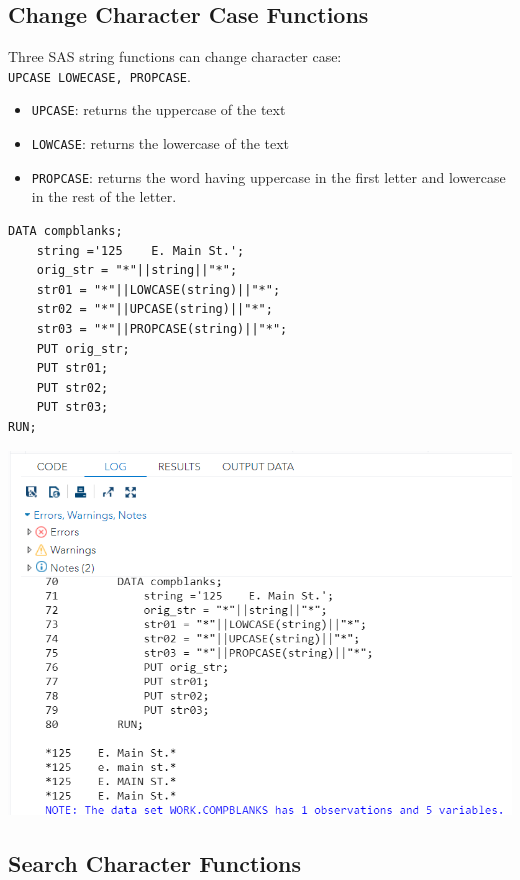 \documentclass[
]{book}
\providecommand{\tightlist}{%
  \setlength{\itemsep}{0pt}\setlength{\parskip}{0pt}}
\begin{document}
\hypertarget{change-character-case-functions}{%
\subsection{Change Character Case Functions}\label{change-character-case-functions}}

Three SAS string functions can change character case: \texttt{UPCASE\ LOWECASE,\ PROPCASE}.

\begin{itemize}
\tightlist
\item
  \texttt{UPCASE}: returns the uppercase of the text
\item
  \texttt{LOWCASE}: returns the lowercase of the text
\item
  \texttt{PROPCASE}: returns the word having uppercase in the first letter and lowercase in the rest of the letter.
\end{itemize}

\begin{verbatim}
DATA compblanks;
    string ='125    E. Main St.';
    orig_str = "*"||string||"*";
    str01 = "*"||LOWCASE(string)||"*";
    str02 = "*"||UPCASE(string)||"*";
    str03 = "*"||PROPCASE(string)||"*";
    PUT orig_str;
    PUT str01;
    PUT str02;
    PUT str03;
RUN;
\end{verbatim}

\begin{center}\includegraphics[width=1\linewidth]{img10/w10-lowUpCases} \end{center}

\hypertarget{search-character-functions}{%
\subsection{Search Character Functions}\label{search-character-functions}}
\end{document}
